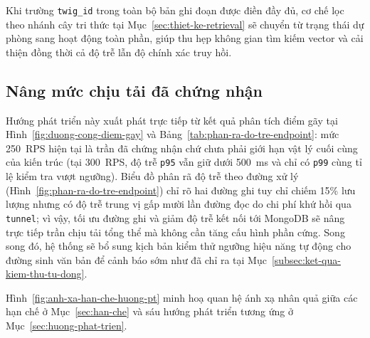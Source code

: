 Khi trường \texttt{twig\_id} trong toàn bộ bản ghi đoạn được điền đầy đủ, cơ chế lọc theo nhánh cây tri thức tại Mục~\ref{sec:thiet-ke-retrieval} sẽ chuyển từ trạng thái dự phòng sang hoạt động toàn phần, giúp thu hẹp không gian tìm kiếm vector và cải thiện đồng thời cả độ trễ lẫn độ chính xác truy hồi.

\subsection{Nâng mức chịu tải đã chứng nhận}
\label{subsec:nang-muc-chiu-tai}

Hướng phát triển này xuất phát trực tiếp từ kết quả phân tích điểm gãy tại Hình~\ref{fig:duong-cong-diem-gay} và Bảng~\ref{tab:phan-ra-do-tre-endpoint}: mức 250~RPS hiện tại là trần đã chứng nhận chứ chưa phải giới hạn vật lý cuối cùng của kiến trúc (tại 300~RPS, độ trễ \texttt{p95} vẫn giữ dưới 500~ms và chỉ có \texttt{p99} cùng tỉ lệ kiểm tra vượt ngưỡng). Biểu đồ phân rã độ trễ theo đường xử lý (Hình~\ref{fig:phan-ra-do-tre-endpoint}) chỉ rõ hai đường ghi tuy chỉ chiếm 15\% lưu lượng nhưng có độ trễ trung vị gấp mười lần đường đọc do chi phí khứ hồi qua \texttt{tunnel}; vì vậy, tối ưu đường ghi và giảm độ trễ kết nối tới MongoDB sẽ nâng trực tiếp trần chịu tải tổng thể mà không cần tăng cấu hình phần cứng. Song song đó, hệ thống sẽ bổ sung kịch bản kiểm thử ngưỡng hiệu năng tự động cho đường sinh văn bản để cảnh báo sớm như đã chỉ ra tại Mục~\ref{subsec:ket-qua-kiem-thu-tu-dong}.

Hình~\ref{fig:anh-xa-han-che-huong-pt} minh hoạ quan hệ ánh xạ nhân quả giữa các hạn chế ở Mục~\ref{sec:han-che} và sáu hướng phát triển tương ứng ở Mục~\ref{sec:huong-phat-trien}.

